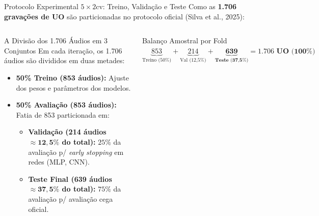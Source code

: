 \documentclass[aspectratio=169]{beamer}
\begin{document}
\begin{frame}{Protocolo Experimental $5\times2\text{cv}$: Treino, Valida\c{c}\~{a}o e Teste}
    \footnotesize
    Como as \textbf{1.706 grava\c{c}\~{o}es de UO} s\~{a}o particionadas no protocolo oficial (Silva et al., 2025):
    
    \vspace{0.08cm}
    \begin{columns}[t]
        \begin{block}{\small A Divis\~{a}o dos 1.706 \'{A}udios em 3 Conjuntos}
            \scriptsize
            Em cada itera\c{c}\~{a}o, os 1.706 \'{a}udios s\~{a}o divididos em duas metades:
            \begin{itemize}
                \item \textbf{50\% Treino (853 \'{a}udios):}
                Ajuste dos pesos e par\^{a}metros dos modelos.
                \item \textbf{50\% Avalia\c{c}\~{a}o (853 \'{a}udios):}
                Fatia de 853 particionada em:
                \begin{itemize}
                    \scriptsize
                    \item \textbf{Valida\c{c}\~{a}o (214 \'{a}udios $\mathbf{\approx 12,5\%}$ do total):} $25\%$ da avalia\c{c}\~{a}o p/ \textit{early stopping} em redes (MLP, CNN).
                    \item \textbf{Teste Final (639 \'{a}udios $\mathbf{\approx 37,5\%}$ do total):} $75\%$ da avalia\c{c}\~{a}o p/ avalia\c{c}\~{a}o cega oficial.
                \end{itemize}
            \end{itemize}
        \end{block}
        
        \begin{block}{\small Balan\c{c}o Amostral por Fold}
            \centering
            \vspace{0.02cm}
            $\underbrace{853}_{\text{Treino (50\%)}} + \underbrace{214}_{\text{Val (12,5\%)}} + \underbrace{\mathbf{639}}_{\textbf{Teste (37,5\%)}} = \mathbf{1.706\text{ UO (100\%)}}$\\
            \vspace{0.02cm}
        \end{block}
        

\end{columns}
\end{frame}
\end{document}
